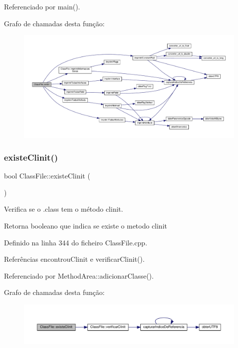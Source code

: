 Referenciado por main().

Grafo de chamadas desta função\+:\nopagebreak
\begin{figure}[H]
\begin{center}
\leavevmode
\includegraphics[width=350pt]{classClassFile_a7da7cc6de8de3fc6f27faf3b76f4883a_cgraph}
\end{center}
\end{figure}
\mbox{\label{classClassFile_a2a886bdb4c42bfaaf5ea8ff1b2c41209}} 
\subsubsection{\texorpdfstring{existe\+Clinit()}{existeClinit()}}
{\footnotesize\ttfamily bool Class\+File\+::existe\+Clinit (\begin{DoxyParamCaption}{ }\end{DoxyParamCaption})}



Verifica se o .class tem o método clinit. 

\begin{DoxyReturn}{Retorna}
booleano que indica se existe o metodo clinit 
\end{DoxyReturn}


Definido na linha 344 do ficheiro Class\+File.\+cpp.



Referências encontrou\+Clinit e verificar\+Clinit().



Referenciado por Method\+Area\+::adicionar\+Classe().

Grafo de chamadas desta função\+:\nopagebreak
\begin{figure}[H]
\begin{center}
\leavevmode
\includegraphics[width=350pt]{classClassFile_a2a886bdb4c42bfaaf5ea8ff1b2c41209_cgraph}
\end{center}
\end{figure}
\mbox{\label{classClassFile_a10bfe22492b473fb0197e55f451978e5}} 

